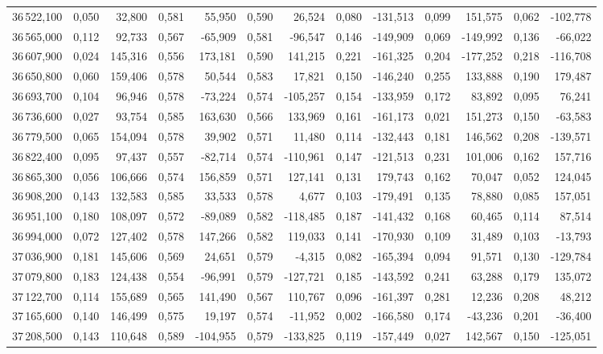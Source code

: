 \begin{longtable}{rrrrrrrrrrrrr}
36\,522,100 & 0,050 & 32,800 & 0,581 & 55,950 & 0,590 & 26,524 & 0,080 & -131,513 & 0,099 & 151,575 & 0,062 & -102,778\\
36\,565,000 & 0,112 & 92,733 & 0,567 & -65,909 & 0,581 & -96,547 & 0,146 & -149,909 & 0,069 & -149,992 & 0,136 & -66,022\\
36\,607,900 & 0,024 & 145,316 & 0,556 & 173,181 & 0,590 & 141,215 & 0,221 & -161,325 & 0,204 & -177,252 & 0,218 & -116,708\\
36\,650,800 & 0,060 & 159,406 & 0,578 & 50,544 & 0,583 & 17,821 & 0,150 & -146,240 & 0,255 & 133,888 & 0,190 & 179,487\\
36\,693,700 & 0,104 & 96,946 & 0,578 & -73,224 & 0,574 & -105,257 & 0,154 & -133,959 & 0,172 & 83,892 & 0,095 & 76,241\\
36\,736,600 & 0,027 & 93,754 & 0,585 & 163,630 & 0,566 & 133,969 & 0,161 & -161,173 & 0,021 & 151,273 & 0,150 & -63,583\\
36\,779,500 & 0,065 & 154,094 & 0,578 & 39,902 & 0,571 & 11,480 & 0,114 & -132,443 & 0,181 & 146,562 & 0,208 & -139,571\\
36\,822,400 & 0,095 & 97,437 & 0,557 & -82,714 & 0,574 & -110,961 & 0,147 & -121,513 & 0,231 & 101,006 & 0,162 & 157,716\\
36\,865,300 & 0,056 & 106,666 & 0,574 & 156,859 & 0,571 & 127,141 & 0,131 & 179,743 & 0,162 & 70,047 & 0,052 & 124,045\\
36\,908,200 & 0,143 & 132,583 & 0,585 & 33,533 & 0,578 & 4,677 & 0,103 & -179,491 & 0,135 & 78,880 & 0,085 & 157,051\\
36\,951,100 & 0,180 & 108,097 & 0,572 & -89,089 & 0,582 & -118,485 & 0,187 & -141,432 & 0,168 & 60,465 & 0,114 & 87,514\\
36\,994,000 & 0,072 & 127,402 & 0,578 & 147,266 & 0,582 & 119,033 & 0,141 & -170,930 & 0,109 & 31,489 & 0,103 & -13,793\\
37\,036,900 & 0,181 & 145,606 & 0,569 & 24,651 & 0,579 & -4,315 & 0,082 & -165,394 & 0,094 & 91,571 & 0,130 & -129,784\\
37\,079,800 & 0,183 & 124,438 & 0,554 & -96,991 & 0,579 & -127,721 & 0,185 & -143,592 & 0,241 & 63,288 & 0,179 & 135,072\\
37\,122,700 & 0,114 & 155,689 & 0,565 & 141,490 & 0,567 & 110,767 & 0,096 & -161,397 & 0,281 & 12,236 & 0,208 & 48,212\\
37\,165,600 & 0,140 & 146,499 & 0,575 & 19,197 & 0,574 & -11,952 & 0,002 & -166,580 & 0,174 & -43,236 & 0,201 & -36,400\\
37\,208,500 & 0,143 & 110,648 & 0,589 & -104,955 & 0,579 & -133,825 & 0,119 & -157,449 & 0,027 & 142,567 & 0,150 & -125,051\\

\end{longtable}
